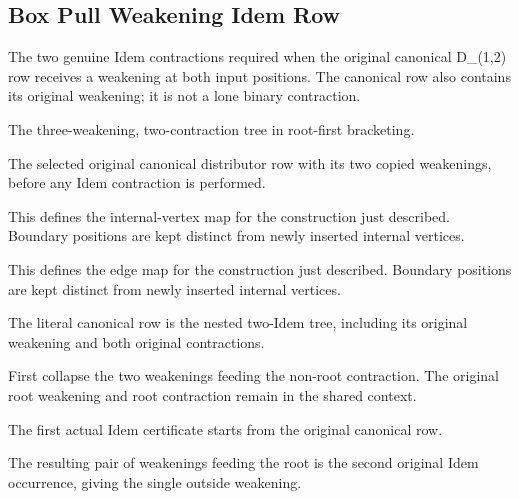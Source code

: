 \subsection{Box Pull Weakening Idem Row}
The two genuine Idem contractions required when the original canonical D\_(1,2) row receives a weakening at both input positions. The canonical row also contains its original weakening; it is not a lone binary contraction.

The three-weakening, two-contraction tree in root-first bracketing.
\par{}

The selected original canonical distributor row with its two copied weakenings, before any Idem contraction is performed.
\par{}

This defines the internal-vertex map for the construction just described. Boundary positions are kept distinct from newly inserted internal vertices.
\par{}

This defines the edge map for the construction just described. Boundary positions are kept distinct from newly inserted internal vertices.
\par{}

The literal canonical row is the nested two-Idem tree, including its original weakening and both original contractions.
\par{}

First collapse the two weakenings feeding the non-root contraction. The original root weakening and root contraction remain in the shared context.
\par{}

The first actual Idem certificate starts from the original canonical row.
\par{}

The resulting pair of weakenings feeding the root is the second original Idem occurrence, giving the single outside weakening.
\par{}

